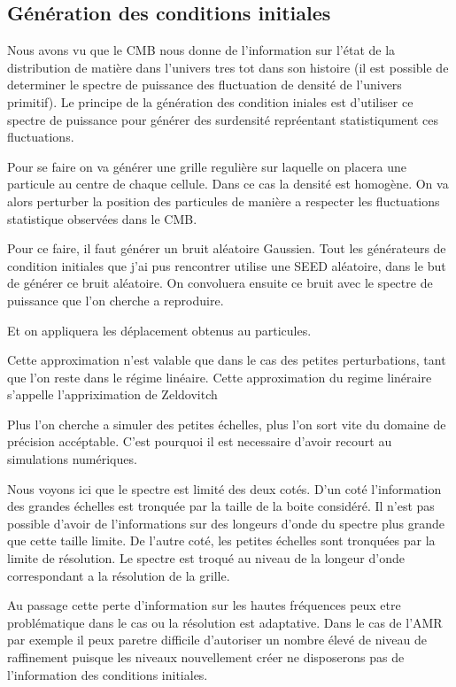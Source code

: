\subsection{Génération des conditions initiales}

Nous avons vu %
que le CMB nous donne de l'information sur l'état de la distribution de matière dans l'univers tres tot dans son histoire (il est possible de determiner le spectre de puissance des fluctuation de densité de l'univers primitif).
Le principe de la génération des condition iniales est d'utiliser ce spectre de puissance pour générer des surdensité repréentant statistiqument ces fluctuations.

Pour se faire on va générer une grille regulière sur laquelle on placera une particule au centre de chaque cellule.
Dans ce cas la densité est homogène.
On va alors perturber la position des particules de manière a respecter les fluctuations statistique observées dans le CMB.

Pour ce faire, il faut générer un bruit aléatoire Gaussien.
Tout les générateurs de condition initiales que j'ai pus rencontrer utilise une SEED aléatoire, dans le but de générer ce bruit aléatoire.
On convoluera ensuite ce bruit avec le spectre de puissance que l'on cherche a reproduire.

Et on appliquera les déplacement obtenus au particules.

Cette approximation n'est valable que dans le cas des petites perturbations, tant que l'on reste dans le régime linéaire.
Cette approximation du regime linéraire s'appelle l'appriximation de Zeldovitch %

Plus l'on cherche a simuler des petites échelles, plus l'on sort vite du domaine de précision accéptable.
C'est pourquoi il est necessaire d'avoir recourt au simulations numériques.

Nous voyons ici que le spectre est limité des deux cotés.
D'un coté l'information des grandes échelles est tronquée par la taille de la boite considéré.
Il n'est pas possible d'avoir de l'informations sur des longeurs d'onde du spectre plus grande que cette taille limite.
De l'autre coté, les petites échelles sont tronquées par la limite de résolution.
Le spectre est troqué au niveau de la longeur d'onde correspondant a la résolution de la grille.

Au passage cette perte d'information sur les hautes fréquences peux etre problématique dans le cas ou la résolution est adaptative.
Dans le cas de l'AMR par exemple il peux paretre difficile d'autoriser un nombre élevé de niveau de raffinement puisque les niveaux nouvellement créer ne disposerons pas de l'information des conditions initiales.


